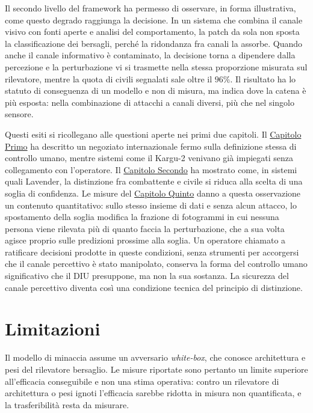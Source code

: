 \ifstampa\documentclass[a4paper,12pt,twoside,openright]{report}\else\documentclass[a4paper,12pt]{report}\fi
\newif\ifrevisione \revisionefalse
\DeclareRobustCommand{\rev}[1]{\ifrevisione{\color{blue!65!black}#1}\else#1\fi}
\newcommand{\notarev}[1]{\ifrevisione\par\medskip\noindent\fcolorbox{blue!65!black}{blue!4}{\parbox{\dimexpr\linewidth-2\fboxsep-2\fboxrule\relax}{\small\setstretch{1}\textbf{Nota per la revisione.} #1}}\par\medskip\fi}
\begin{document}
\rev{Il secondo livello del framework ha permesso di osservare, in forma illustrativa, come questo degrado raggiunga la decisione. In un sistema che combina il canale visivo con fonti aperte e analisi del comportamento, la patch da sola non sposta la classificazione dei bersagli, perché la ridondanza fra canali la assorbe. Quando anche il canale informativo è contaminato, la decisione torna a dipendere dalla percezione e la perturbazione vi si trasmette nella stessa proporzione misurata sul rilevatore, mentre la quota di civili segnalati sale oltre il $96\%$. Il risultato ha lo statuto di conseguenza di un modello e non di misura, ma indica dove la catena è più esposta: nella combinazione di attacchi a canali diversi, più che nel singolo sensore.

Questi esiti si ricollegano alle questioni aperte nei primi due capitoli. Il \hyperref[cap1]{Capitolo Primo} ha descritto un negoziato internazionale fermo sulla definizione stessa di controllo umano, mentre sistemi come il Kargu-2 venivano già impiegati senza collegamento con l'operatore. Il \hyperref[cap2]{Capitolo Secondo} ha mostrato come, in sistemi quali Lavender, la distinzione fra combattente e civile si riduca alla scelta di una soglia di confidenza. Le misure del \hyperref[cap5]{Capitolo Quinto} danno a questa osservazione un contenuto quantitativo: sullo stesso insieme di dati e senza alcun attacco, lo spostamento della soglia modifica la frazione di fotogrammi in cui nessuna persona viene rilevata più di quanto faccia la perturbazione, che a sua volta agisce proprio sulle predizioni prossime alla soglia. Un operatore chiamato a ratificare decisioni prodotte in queste condizioni, senza strumenti per accorgersi che il canale percettivo è stato manipolato, conserva la forma del controllo umano significativo che il DIU presuppone, ma non la sua sostanza. La sicurezza del canale percettivo diventa così una condizione tecnica del principio di distinzione.}

\notarev{Paragrafi aggiunti su richiesta del Prof. Buffa, per ricollegare i risultati ai Capitoli Primo e Secondo e chiudere l'obiettivo sulla propagazione alla decisione.}

\section{Limitazioni}

\rev{Il modello di minaccia assume un avversario \textit{white-box}, che conosce
architettura e pesi del rilevatore bersaglio. Le misure riportate sono
pertanto un limite superiore all'efficacia conseguibile e non una stima
operativa: contro un rilevatore di architettura o pesi ignoti l'efficacia
sarebbe ridotta in misura non quantificata, e la trasferibilità resta da
misurare.}
\end{document}
